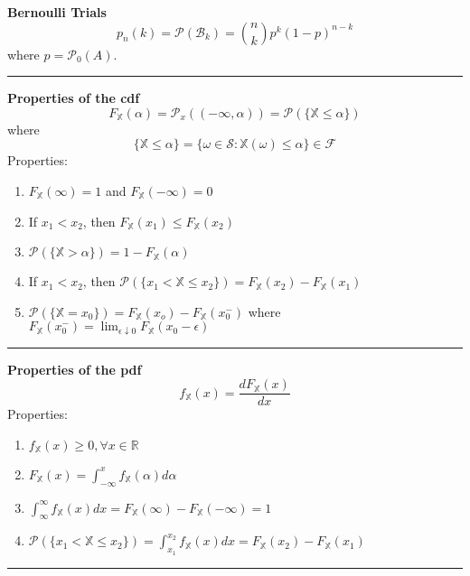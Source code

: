 \documentclass{article}
\renewcommand{\S}{\mathcal{S}}
\renewcommand{\P}{\mathcal{P}}
\providecommand{\B}{\mathcal{B}}
\providecommand{\F}{\mathcal{F}}
\providecommand{\X}{\mathbb{X}}
\providecommand{\R}{\mathbb{R}}
\begin{document}
\begin{multicols*}{3}
        \textbf{Bernoulli Trials}
        \begin{equation*}
            p_n(k)=\P(\B_k)={n\choose k}p^k(1-p)^{n-k}
        \end{equation*}
        where $p=\P_0(A)$.

        \noindent\rule{\columnwidth}{0.4pt}

        \textbf{Properties of the cdf}
        \begin{equation*}
            F_{\X}(\alpha)=\P_x((-\infty,\alpha))=\P(\{\X\leq\alpha\})
        \end{equation*}
        where
        \begin{equation*}
            \{\X\leq\alpha\} = \{\omega\in\S:\X(\omega)\leq\alpha\}\in\F
        \end{equation*}
        Properties:
        \begin{enumerate}
            \item $F_\X(\infty)=1$ and $F_\X(-\infty)=0$
            \item If $x_1<x_2$, then $F_\X(x_1)\leq F_\X(x_2)$
            \item $\P(\{\X>\alpha\}) = 1-F_\X(\alpha)$
            \item If $x_1<x_2$, then $\P(\{x_1<\X\leq x_2\}) = F_\X(x_2)-F_\X(x_1)$
            \item $\P(\{\X=x_0\}) = F_\X(x_o)-F_\X(x_0^-)$ where $F_\X(x_0^-)=\lim_{\epsilon\downarrow0}F_\X(x_0-\epsilon)$
        \end{enumerate}

        \noindent\rule{\columnwidth}{0.4pt}

        \textbf{Properties of the pdf}
        \begin{equation*}
            f_{\X}(x)=\frac{dF_\X(x)}{dx}
        \end{equation*}
        Properties:
        \begin{enumerate}
            \item $f_\X(x)\geq0,\forall x\in\R$
            \item $F_\X(x)=\int_{-\infty}^{x} f_\X(\alpha)d\alpha $
            \item $\int_{\infty}^{\infty} f_\X(x)dx = F_\X(\infty) - F_\X(-\infty) = 1$
            \item $\P(\{x_1<\X\leq x_2\}) =\int_{x_1}^{x_2}f_\X(x)dx=F_\X(x_2)-F_\X(x_1) $
        \end{enumerate}

        \noindent\rule{\columnwidth}{0.4pt}


\end{multicols*}
\end{document}
